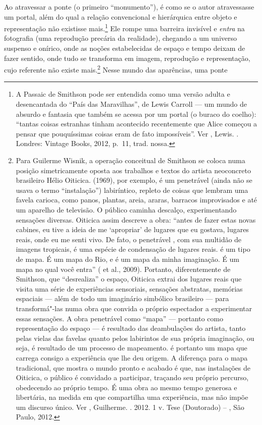 Ao atravessar a ponte (o primeiro ``monumento''), é como se o autor
atravessasse um portal, além do qual a relação convencional e
hierárquica entre objeto e representação não existisse mais.\footnote{A
  Passaic de Smithson pode ser entendida como uma versão adulta e
  desencantada do ``País das Maravilhas'', de Lewis Carroll --- um mundo
  de absurdo e fantasia que também se acessa por um portal (o buraco do
  coelho): ``tantas coisas estranhas tinham acontecido recentemente que
  Alice começou a pensar que pouquíssimas coisas eram de fato
  impossíveis''. Ver , Lewis. {}. Londres: Vintage Books, 2012, p.~11, trad. nossa.} Ele
rompe uma barreira invisível e \emph{entra} na fotografia (uma
reprodução precária da realidade), chegando a um universo suspenso e
onírico, onde as noções estabelecidas de espaço e tempo deixam de fazer
sentido, onde tudo se transforma em imagem, reprodução e representação,
cujo referente não existe mais.\footnote{Para Guilerme Wisnik, a
  operação conceitual de Smithson se coloca numa posição simetricamente
  oposta aos trabalhos e textos do artista neoconcreto brasileiro Hélio
  Oiticica. {} (1969), por exemplo, é um penetrável
  (ainda não se usava o termo ``instalação'') labiríntico, repleto de
  coisas que lembram uma favela carioca, como panos, plantas, areia,
  araras, barracos improvisados e até um aparelho de televisão. O
  público caminha descalço, experimentando sensações diversas. Oiticica
  assim descreve a obra: ``antes de fazer estas novas cabines, eu tive a
  ideia de me `apropriar' de lugares que eu gostava, lugares reais, onde
  eu me senti vivo. De fato, o penetrável {}, com sua multidão
  de imagens tropicais, é uma espécie de condensação de lugares
  reais. {} é um tipo de mapa. É um mapa do Rio, e é um mapa da
  minha imaginação. É um mapa no qual você entra'' ( et
  al., 2009). Portanto, diferentemente de Smithson, que ``desrealiza'' o
  espaço, Oiticica extrai dos lugares reais que visita uma série de
  experiências sensoriais, sensações abstratas, memórias espaciais ---
  além de todo um imaginário simbólico brasileiro --- para transformá"-las
  numa obra que convida o próprio espectador a experimentar essas
  sensações. A obra penetrável como ``mapa'' --- portanto como
  representação do espaço --- é resultado das deambulações do artista,
  tanto pelas vielas das favelas quanto pelos labirintos de sua própria
  imaginação, ou seja, é resultado de um processo de mapeamento.
  {} é portanto um mapa que carrega consigo a experiência
  que lhe deu origem. A diferença para o mapa tradicional, que mostra o
  mundo pronto e acabado é que, nas instalações de Oiticica, o público é
  convidado a participar, traçando seu próprio percurso, obedecendo ao
  próprio tempo. É uma obra ao mesmo tempo generosa e libertária, na
  medida em que compartilha uma experiência, mas não impõe um discurso
  único. Ver , Guilherme. {}. 2012. 1 v. Tese (Doutorado) --
  , São Paulo, 2012.} Nesse mundo das aparências, uma ponte
